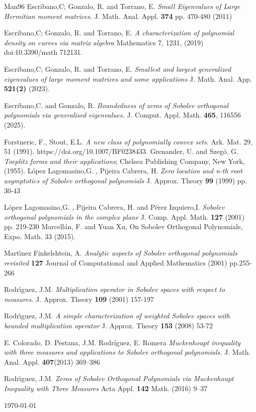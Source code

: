 \documentclass[12pt]{amsart}
\theoremstyle{definition}
\theoremstyle{plain}
\theoremstyle{remark}
\begin{document}
\begin{thebibliography}{Man96}
 Escribano,C; Gonzalo, R. and Torrano, E. \emph{ Small Eigenvalues of Large Hermitian
moment matrices.} J. Math. Anal. Appl. {\bf 374}  pp. 470-480 (2011)

 Escribano,C; Gonzalo, R. and Torrano, E. \emph{ A characterization of polynomial density on curves via matrix algebra} Mathematics 7, 1231,  (2019) doi:10.3390/math 712131.
 
  Escribano,C; Gonzalo, R. and Torrano, E.  \emph{Smallest and largest generalized eigenvalues of large moment matrices and some applications} J. Math. Anal. App. {\bf 521(2)} (2023).

 Escribano,C. and  Gonzalo, R. \emph{Boundedness of zeros of Sobolev orthogonal polynomials via generalised eigenvalues.} J. Comput. Appl. Math. \textbf{465}, 116556 (2025). 

 Forstneric, F., Stout, E.L. \emph{A new class of polynomially convex sets}. Ark. Mat. 29, 51 (1991).
https://doi.org/10.1007/BF0238433.
 Grenander, U. and Szegö, G. \emph{Toeplitz forms and their applications}; Chelsea Publishing Company, New York, (1955). 
 L\'{o}pez Lagomasino,G. , Pijeira Cabrera, H. \emph{Zero location and n-th root asymptotics of Sobolev orthogonal polynomials} J. Approx. Theory {\bf 99} (1999) pp. 30-43


 L\'{o}pez Lagomasino,G. , Pijeira Cabrera, H. and P\'{e}rez Izquiero,I. \emph{Sobolev orthogonal polynomials in the complex plane} J. Comp. Appl. Math. {\bf 127} (2001) pp. 
 219-230
 Marcell\'an, F. and Yuan Xu, On Sobolev Orthogonal Polynomials, Expo. Math. 33 (2015).

 Mart\'{\i}nez Finkelshtein, A. \emph{Analytic aspects of Sobolev orthogonal polynomials revisited} {\bf 127}  Journal of Computational and Applied Mathematics (2001) pp.255-266


 Rodr\'{\i}guez, J.M. \emph{Multiplication operator in Sobolev spaces with respect to measures.} J. Approx. Theory {\bf 109}  (2001) 157-197

 Rodr\'{\i}guez, J.M.  \emph{ A simple characterization of weighted Sobolev spaces with bounded multiplication operator} J. Approx. Theory {\bf 153} (2008) 53-72

 E. Colorado, D. Pestana, J.M. Rodríguez, E. Romera \emph{Muckenhoupt inequality with three measures and applications to Sobolev orthogonal polynomials.} J. Math. Anal. Appl. {\bf 407}(2013) 369–386

 Rodr\'{\i}guez, J.M. \emph{ Zeros of Sobolev Orthogonal Polynomials via Muckenhoupt Inequality with Three Measures} Acta Appl. {\bf 142} Math. (2016) 9–37

\end{thebibliography}

\today
\end{document}
